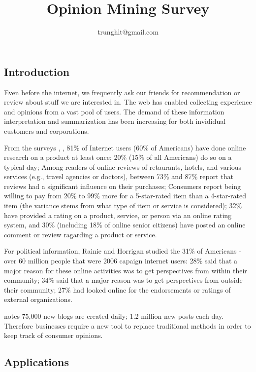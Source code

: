 \documentclass{article}
\title{\textbf{Opinion Mining Survey}}
\author{trunghlt@gmail.com}\date{}
\begin{document}
\maketitle
\thispagestyle{fancy}

\begin{multicols}{2}
 
\section{Introduction}
    Even before the internet, we frequently ask our friends for recommendation
or review about stuff we are interested in. The web has enabled collecting 
experience and opinions from a vast pool of users. The demand of these 
information interpretation and summarization has been increasing for both
invididual customers and corporations.

    From the surveys \citet{comScore2007}, \citet{Horrigan2008}, 81\% of Internet 
users (60\% of Americans) have done online research on a product at least once;
20\% (15\% of all Americans) do so on a typical day; Among readers of online 
reviews of retaurants, hotels, and various services (e.g., travel agencies or 
doctors), between 73\% and 87\% report that reviews had a significant influence 
on their purchases; Consumers report being willing to pay from 20\% to 99\% more for
a 5-star-rated item than a 4-star-rated item (the variance stems from what
type of item or service is considered); 32\% have provided a rating on a product, 
service, or person via an online rating system, and 30\% (including 18\% of 
online senior citizens) have posted an online comment or review ragarding a 
product or service.

    For political information, Rainie and Horrigan \citet{Rainie2007} studied 
the 31\% of Americans - over 60 million people that were 2006 capaign internet 
users: 28\% said that a major reason for these online activities was to
get perspectives from within their community; 34\% said that a major reason was 
to get perspectives from outside their community; 27\% had looked online for 
the endorsements or ratings of external organizations.
      
    \citet{ForrestWave2006} notes 75,000 new blogs are created daily; 1.2 million 
new posts each day. Therefore businesses require a new tool to replace traditional 
methods in order to keep track of consumer opinions.

\subsection{Applications}

\end{multicols}
\end{document}
